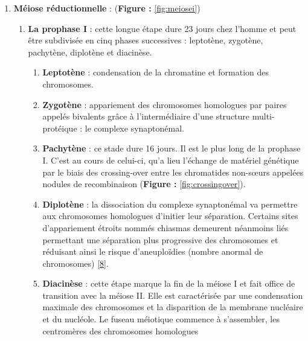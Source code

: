 \documentclass[12pt,twoside]{ugathesis}
\providecommand{\tightlist}{%
  \setlength{\itemsep}{0pt}\setlength{\parskip}{0pt}}
\theoremstyle{definition}
\theoremstyle{definition}
\theoremstyle{remark}
\begin{document}
\newpage

\begin{enumerate}
\def\labelenumi{\arabic{enumi}.}
\tightlist
\item
  \textbf{Méiose réductionnelle} : (\textbf{Figure : }\ref{fig:meiosei})

  \begin{enumerate}
  \def\labelenumii{\alph{enumii}.}
  \item
    \textbf{La prophase I} : cette longue étape dure 23 jours chez
    l'homme et peut être subdivisée en cinq phases successives :
    leptotène, zygotène, pachytène, diplotène et diacinèse.

    \begin{enumerate}
    \def\labelenumiii{\roman{enumiii}.}
    \tightlist
    \item
      \textbf{Leptotène} : condensation de la chromatine et formation
      des chromosomes.\\
    \item
      \textbf{Zygotène} : appariement des chromosomes homologues par
      paires appelés bivalents grâce à l'intermédiaire d'une structure
      multi-protéique : le complexe synaptonémal.\\
    \item
      \textbf{Pachytène} : ce stade dure 16 jours. Il est le plus long
      de la prophase I. C'est au cours de celui-ci, qu'a lieu l'échange
      de matériel génétique par le biais des crossing-over entre les
      chromatides non-sœurs appelées nodules de recombinaison
      (\textbf{Figure : }\ref{fig:crossingover}).\\
    \item
      \textbf{Diplotène} : la dissociation du complexe synaptonémal va
      permettre aux chromosomes homologues d'initier leur séparation.
      Certains sites d'appariement étroits nommés chiasmas demeurent
      néanmoins liés permettant une séparation plus progressive des
      chromosomes et réduisant ainsi le risque d'aneuploïdies (nombre
      anormal de chromosomes)
      {[}\protect\hyperlink{ref-Handyside2012}{8}{]}.\\
    \item
      \textbf{Diacinèse} : cette étape marque la fin de la méiose I et
      fait office de transition avec la méiose II. Elle est caractérisée
      par une condensation maximale des chromosomes et la disparition de
      la membrane nucléaire et du nucléole. Le fuseau méiotique commence
      à s'assembler, les centromères des chromosomes homologues

\end{enumerate}
\end{enumerate}
\end{enumerate}
\end{document}
